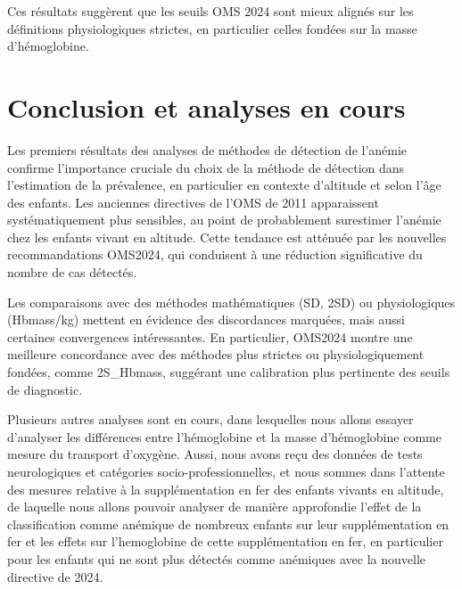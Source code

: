 \documentclass[12pt,a4paper]{article}
\begin{document}
Ces résultats suggèrent que les seuils OMS 2024 sont mieux alignés sur les définitions physiologiques strictes, en particulier celles fondées sur la masse d’hémoglobine.

\section*{Conclusion et analyses en cours}
Les premiers résultats des analyses de méthodes de détection de l'anémie confirme l’importance cruciale du choix de la méthode de détection dans l’estimation de la prévalence, en particulier en contexte d’altitude et selon l’âge des enfants. Les anciennes directives de l’OMS de 2011 apparaissent systématiquement plus sensibles, au point de probablement surestimer l’anémie chez les enfants vivant en altitude. Cette tendance est atténuée par les nouvelles recommandations OMS2024, qui conduisent à une réduction significative du nombre de cas détectés.

Les comparaisons avec des méthodes mathématiques (SD, 2SD) ou physiologiques (Hbmass/kg) mettent en évidence des discordances marquées, mais aussi certaines convergences intéressantes. En particulier, OMS2024 montre une meilleure concordance avec des méthodes plus strictes ou physiologiquement fondées, comme 2S\_Hbmass, suggérant une calibration plus pertinente des seuils de diagnostic.

Plusieurs autres analyses sont en cours, dans lesquelles nous allons essayer d'analyser les différences entre l'hémoglobine et la masse d'hémoglobine comme mesure du transport d'oxygène. Aussi, nous avons reçu des données de tests neurologiques et catégories socio-professionnelles, et nous sommes dans l'attente des mesures relative à la supplémentation en fer des enfants vivants en altitude, de laquelle nous allons pouvoir analyser de manière approfondie l'effet de la classification comme anémique de nombreux enfants sur leur supplémentation en fer et les effets sur l'hemoglobine de cette supplémentation en fer, en particulier pour les enfants qui ne sont plus détectés comme anémiques avec la nouvelle directive de 2024.

\printbibliography
\end{document}
